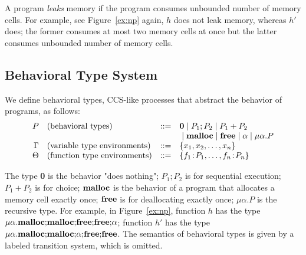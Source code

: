 \documentclass{sigplanconf}
\begin{document}

A program \emph{leaks} memory if the program consumes unbounded number
of memory cells.  For example, see Figure~\ref{ex:np} again, \(h\)
does not leak memory, whereas \(h'\) does; the former
consumes at most two memory cells at once but the latter consumes
unbounded number of memory cells.

\subsection{Behavioral Type System}
 We define behavioral types, CCS-like processes that abstract the
 behavior of programs, as follows:
\[
\begin{array}{rlcl}
  P & (\mbox{behavioral types})&::=& {\bf 0} \;|\; P_{1};P_{2} \;|\; P_{1}+P_{2} \\
     & & & \;|\; \mathbf{malloc} \;|\; \mathbf{free} \;|\; \alpha \;|\; \mu\alpha.P \\
  \Gamma & (\mbox{variable type environments}) &::=& \{x_1, x_2, \dots, x_n\}\\
  \Theta & (\mbox{function type environments}) &::=& \{f_1\!:\! P_1,\dots,f_n\!:\! P_n\}\\
\end{array}
\]

The type {\bf 0} is the behavior "does nothing"; $P_{1};P_{2}$ is for
sequential execution; $P_{1}+P_{2}$ is for choice; $\mathbf{malloc}$ is the
behavior of a program that allocates a memory cell exactly once;
$\mathbf{free}$ is for deallocating exactly once; $\mu\alpha.P$ is the
recursive type. For example, in Figure~\ref{ex:np}, function \(h\) has
the type
\(\mu\alpha.\mathbf{malloc};\!\mathbf{malloc};\!\mathbf{free};\!\mathbf{free};\!\alpha\);
function \(h'\) has the type
\(\mu\alpha.\mathbf{malloc};\!\mathbf{malloc};\!\alpha;\!\mathbf{free};\!\mathbf{free}\).  The
semantics of behavioral types is given by a labeled transition system,
which is omitted.
\end{document}
